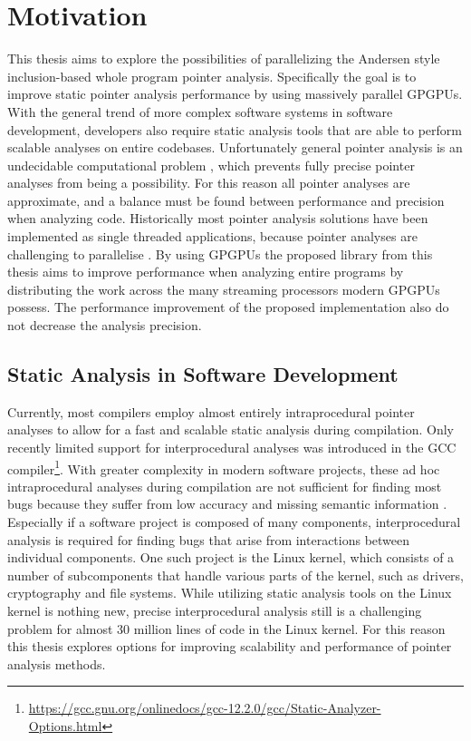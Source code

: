 \section{Motivation}
This thesis aims to explore the possibilities of parallelizing the Andersen style inclusion-based whole program pointer analysis. Specifically the goal is to improve static pointer analysis performance by using massively parallel GPGPUs.
With the general trend of more complex software systems in software development, developers also require static analysis tools that are able to perform scalable analyses on entire codebases.
Unfortunately general pointer analysis is an undecidable computational problem \cite{landi1992undecidability}, which prevents fully precise pointer analyses from being a possibility.
For this reason all pointer analyses are approximate, and a balance must be found between performance and precision when analyzing code.
Historically most pointer analysis solutions have been implemented as single threaded applications, because pointer analyses are challenging to parallelise \cite{su2015efficient}. By using GPGPUs the proposed library from this thesis aims to improve performance when analyzing entire programs by distributing the work across the many streaming processors modern GPGPUs possess. The performance improvement of the proposed implementation also do not decrease the analysis precision.
\subsection{Static Analysis in Software Development}
Currently, most compilers employ almost entirely intraprocedural pointer analyses to allow for a fast and scalable static analysis during compilation. Only recently limited support for interprocedural analyses was introduced in the GCC compiler\footnote{\url{https://gcc.gnu.org/onlinedocs/gcc-12.2.0/gcc/Static-Analyzer-Options.html}}.
With greater complexity in modern software projects, these ad hoc intraprocedural analyses during compilation are not sufficient for finding most bugs because they suffer from low accuracy and missing semantic information \cite{gu2020towards}.
Especially if a software project is composed of many components, interprocedural analysis is required for finding bugs that arise from interactions between individual components.
One such project is the Linux kernel, which consists of a number of subcomponents that handle various parts of the kernel, such as drivers, cryptography and file systems.
While utilizing static analysis tools on the Linux kernel is nothing new, precise interprocedural analysis still is a challenging problem for almost 30 million lines of code in the Linux kernel.
For this reason this thesis explores options for improving scalability and performance of pointer analysis methods.


